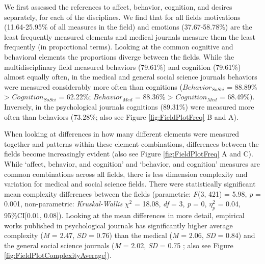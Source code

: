 We first assessed the references to affect, behavior, cognition, and
desires separately, for each of the disciplines. We find that for all
fields motivations (11.64-25.95\% of all measures in the field) and
emotions (37.67-58.78\%) are the least frequently measured elements and
medical journals measure them the least frequently (in proportional
terms). Looking at the common cognitive and behavioral elements the
proportions diverge between the fields. While the multidisciplinary
field measured behaviors (79.61\%) and cognition (79.61\%) almost
equally often, in the medical and general social science journals
behaviors were measured considerably more often than cognitions
(\(Behavior_{SoSci}\) = 88.89\% \textgreater{} \(Cognition_{SoSci}\) =
62.22\%; \(Behavior_{Med}\) = 88.36\% \textgreater{} \(Cognition_{Med}\)
= 68.49\%). Inversely, in the psychological journals cognitions
(89.31\%) were measured more often than behaviors (73.28\%; also see
Figure \ref{fig:FieldPlotFreq} B and A).

When looking at differences in how many different elements were measured
together and patterns within these element-combinations, differences
between the fields become increasingly evident (also see Figure
\ref{fig:FieldPlotFreq} A and C). While `affect, behavior, and
cognition' and `behavior, and cognition' measures are common
combinations across all fields, there is less dimension complexity and
variation for medical and social science fields. There were
statistically significant mean complexity differences between the fields
(parametric: \textit{F}(3, 421) = 5.98, \textit{p} = 0.001,
non-parametric: \textit{Kruskal-Wallis} \(\chi^{2}\) = 18.08,
\textit{df} = 3, \textit{p} = 0, \(\eta_{p}^{2}\) = 0.04, 95\%CI{[}0.01,
0.08{]}). Looking at the mean differences in more detail, empirical
works published in psychological journals has significantly higher
average complexity (\textit{M} = 2.47, \textit{SD} = 0.76) than the
medical (\textit{M} = 2.06, \textit{SD} = 0.84) and the general social
science journals (\textit{M} = 2.02, \textit{SD} = 0.75 ; also see
Figure \ref{fig:FieldPlotComplexityAverage}).


